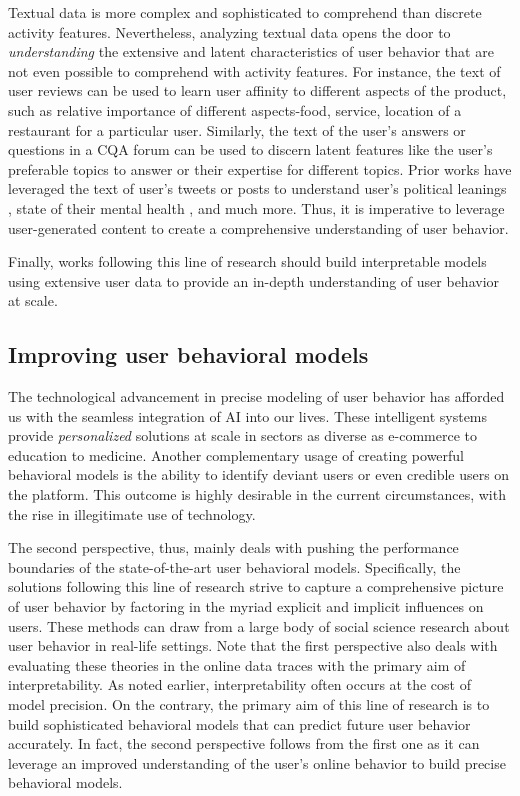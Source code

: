 Textual data is more complex and sophisticated to comprehend than discrete activity features. Nevertheless, analyzing textual data opens the door to \emph{understanding} the extensive and latent characteristics of user behavior that are not even possible to comprehend with activity features. For instance, the text of user reviews can be used to learn user affinity to different aspects of the product, such as relative importance of different aspects-food, service, location of a restaurant for a particular user.
Similarly, the text of the user's answers or questions in a CQA forum can be used to discern latent features like the user's preferable topics to answer or their expertise for different topics. Prior works have leveraged the text of user's tweets or posts to understand user's political leanings \cite{political}, state of their mental health \cite{mentalhealth}, and much more. Thus, it is imperative to leverage user-generated content to create a comprehensive understanding of user behavior.

Finally, works following this line of research should build interpretable models using extensive user data to provide an in-depth understanding of user behavior at scale.

\subsection{Improving user behavioral models}
The technological advancement in precise modeling of user behavior has afforded us with the seamless integration of AI into our lives. These intelligent systems provide \emph{personalized} solutions at scale in sectors as diverse as e-commerce to education to medicine. Another complementary usage of creating powerful behavioral models is the ability to identify deviant users or even credible users on the platform. This outcome is highly desirable in the current circumstances, with the rise in illegitimate use of technology.

The second perspective, thus, mainly deals with
pushing the performance boundaries of the state-of-the-art user behavioral models.
Specifically, the solutions following this line of research strive to capture a comprehensive picture of user behavior by factoring in the myriad explicit and implicit influences on users. These methods can draw from a large body of social science research about user behavior in real-life settings. Note that the first perspective also deals with evaluating these theories in the online data traces with the primary aim of interpretability. As noted earlier, interpretability often occurs at the cost of model precision.
On the contrary, the primary aim of this line of research is to build sophisticated behavioral models that can predict future user behavior accurately. In fact, the second perspective follows from the first one as it can leverage an improved understanding of the user's online behavior to build precise behavioral models.

